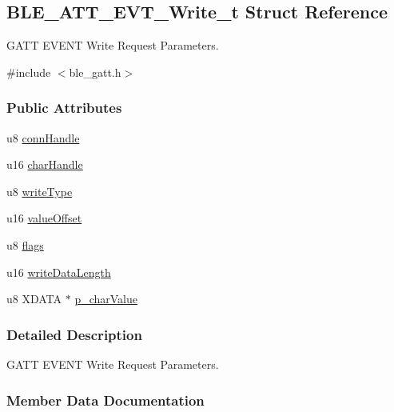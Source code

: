 \hypertarget{struct_b_l_e___a_t_t___e_v_t___write__t}{}\subsection{B\+L\+E\+\_\+\+A\+T\+T\+\_\+\+E\+V\+T\+\_\+\+Write\+\_\+t Struct Reference}
\label{struct_b_l_e___a_t_t___e_v_t___write__t}


G\+A\+TT E\+V\+E\+NT Write Request Parameters.  




{\ttfamily \#include $<$ble\+\_\+gatt.\+h$>$}

\subsubsection*{Public Attributes}
\begin{DoxyCompactItemize}
\item 
u8 \hyperlink{struct_b_l_e___a_t_t___e_v_t___write__t_a194cae0c814ddbab6f128daf30a38a76}{conn\+Handle}
\item 
u16 \hyperlink{struct_b_l_e___a_t_t___e_v_t___write__t_a4941bfa5cdcb87938bbe50adfe39169a}{char\+Handle}
\item 
u8 \hyperlink{struct_b_l_e___a_t_t___e_v_t___write__t_ab80fc4f4dda9f2b98b45bf1b71d1c9fe}{write\+Type}
\item 
u16 \hyperlink{struct_b_l_e___a_t_t___e_v_t___write__t_a730e34f88af2d5b0ba9e02a7bdb698ae}{value\+Offset}
\item 
u8 \hyperlink{struct_b_l_e___a_t_t___e_v_t___write__t_a6975ba28b678e3120cb99ac2fa4963f0}{flags}
\item 
u16 \hyperlink{struct_b_l_e___a_t_t___e_v_t___write__t_a4a8a607c349cdedb0e67f96463ca7c47}{write\+Data\+Length}
\item 
u8 X\+D\+A\+TA $\ast$ \hyperlink{struct_b_l_e___a_t_t___e_v_t___write__t_afdedd38ebfaf004b919426aab36eb16b}{p\+\_\+char\+Value}
\end{DoxyCompactItemize}


\subsubsection{Detailed Description}
G\+A\+TT E\+V\+E\+NT Write Request Parameters. 

\subsubsection{Member Data Documentation}
